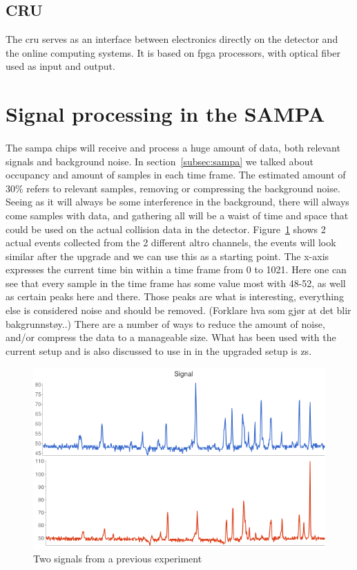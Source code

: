 \documentclass[a4paper]{report}
\begin{document}
{\subsection{CRU}
The \gls{cru} serves as an interface between electronics directly on the detector and the online computing systems.
It is based on \gls{fpga} processors, with optical fiber used as input and output. %
}

\section{Signal processing in the SAMPA}
\paragraph{}
The \gls{sampa} chips will receive and process a huge amount of data, both relevant signals and background noise.
In section~\ref{subsec:sampa} we talked about occupancy and amount of samples in each time frame.
The estimated amount of 30\% refers to relevant samples, removing or compressing the background noise.
Seeing as it will always be some interference in the background, there will always come samples with data, and gathering all will be a waist of time and space that could be used on the actual collision data in the detector.
Figure~\ref{fig:signal} shows 2 actual events collected from the 2 different \gls{altro} channels, the events will look similar after the upgrade and we can use this as a starting point.
The x-axis expresses the current time bin within a time frame from 0 to 1021.
Here one can see that every sample in the time frame has some value most with 48-52, as well as certain peaks here and there.
Those peaks are what is interesting, everything else is considered noise and should be removed.
(Forklare hva som gjør at det blir bakgrunnstøy..)
There are a number of ways to reduce the amount of noise, and/or compress the data to a manageable size.
What has been used with the current setup and is also discussed to use in in the upgraded setup is \gls{zs}.

\begin{figure}[h!]
	\centering
		\includegraphics[width=1.0\textwidth]{images/signal.png}
		\caption{Two signals from a previous experiment}
		\label{fig:signal}
\end{figure}
\end{document}
